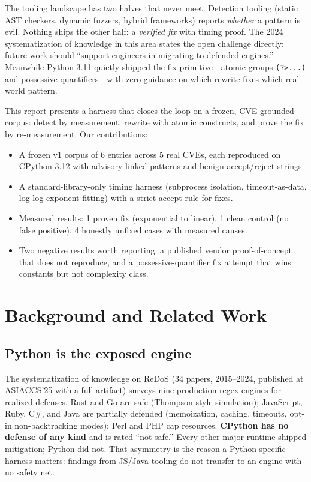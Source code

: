 \documentclass[11pt,a4paper]{article}
\begin{document}
The tooling landscape has two halves that never meet. Detection tooling (static AST checkers, dynamic fuzzers, hybrid frameworks) reports \textit{whether} a pattern is evil. Nothing ships the other half: a \textit{verified fix} with timing proof. The 2024 systematization of knowledge in this area states the open challenge directly: future work should ``support engineers in migrating to defended engines.'' Meanwhile Python 3.11 quietly shipped the fix primitive---atomic groups \verb!(?>...)! and possessive quantifiers---with zero guidance on which rewrite fixes which real-world pattern.

This report presents a harness that closes the loop on a frozen, CVE-grounded corpus: detect by measurement, rewrite with atomic constructs, and prove the fix by re-measurement. Our contributions:

\begin{itemize}
    \item A frozen v1 corpus of 6 entries across 5 real CVEs, each reproduced on CPython 3.12 with advisory-linked patterns and benign accept/reject strings.
    \item A standard-library-only timing harness (subprocess isolation, timeout-as-data, log-log exponent fitting) with a strict accept-rule for fixes.
    \item Measured results: 1 proven fix (exponential to linear), 1 clean control (no false positive), 4 honestly unfixed cases with measured causes.
    \item Two negative results worth reporting: a published vendor proof-of-concept that does not reproduce, and a possessive-quantifier fix attempt that wins constants but not complexity class.
\end{itemize}

\section{Background and Related Work}

\subsection{Python is the exposed engine}

The systematization of knowledge on ReDoS (34 papers, 2015--2024, published at ASIACCS'25 with a full artifact) surveys nine production regex engines for realized defenses. Rust and Go are safe (Thompson-style simulation); JavaScript, Ruby, C\#, and Java are partially defended (memoization, caching, timeouts, opt-in non-backtracking modes); Perl and PHP cap resources. \textbf{CPython has no defense of any kind} and is rated ``not safe.'' Every other major runtime shipped mitigation; Python did not. That asymmetry is the reason a Python-specific harness matters: findings from JS/Java tooling do not transfer to an engine with no safety net.
\end{document}
